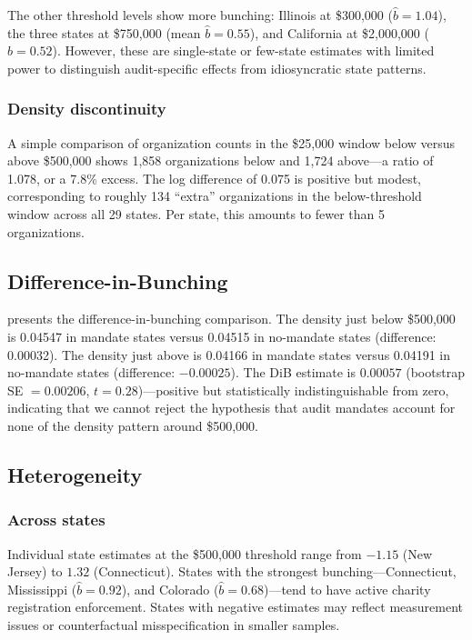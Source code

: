 \documentclass[12pt]{article}
\begin{document}
The other threshold levels show more bunching: Illinois at \$300,000 ($\hat{b} = 1.04$), the three states at \$750,000 (mean $\hat{b} = 0.55$), and California at \$2,000,000 ($\hat{b} = 0.52$). However, these are single-state or few-state estimates with limited power to distinguish audit-specific effects from idiosyncratic state patterns.

\subsubsection*{Density discontinuity} A simple comparison of organization counts in the \$25,000 window below versus above \$500,000 shows 1,858 organizations below and 1,724 above---a ratio of 1.078, or a 7.8\% excess. The log difference of 0.075 is positive but modest, corresponding to roughly 134 ``extra'' organizations in the below-threshold window across all 29 states. Per state, this amounts to fewer than 5 organizations.

\subsection{Difference-in-Bunching}



 presents the difference-in-bunching comparison. The density just below \$500,000 is 0.04547 in mandate states versus 0.04515 in no-mandate states (difference: 0.00032). The density just above is 0.04166 in mandate states versus 0.04191 in no-mandate states (difference: $-0.00025$). The DiB estimate is $0.00057$ (bootstrap SE $= 0.00206$, $t = 0.28$)---positive but statistically indistinguishable from zero, indicating that we cannot reject the hypothesis that audit mandates account for none of the density pattern around \$500,000.

\subsection{Heterogeneity}

\subsubsection*{Across states} Individual state estimates at the \$500,000 threshold range from $-1.15$ (New Jersey) to $1.32$ (Connecticut). States with the strongest bunching---Connecticut, Mississippi ($\hat{b} = 0.92$), and Colorado ($\hat{b} = 0.68$)---tend to have active charity registration enforcement. States with negative estimates may reflect measurement issues or counterfactual misspecification in smaller samples.
\end{document}

